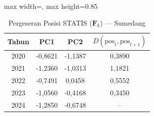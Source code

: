 \begin{table}[H]
\centering
\caption{Pergeseran Posisi STATIS ($\mathbf{F}_k$) --- Sumedang} \label{tab:app1jarak_statis_skor_sumedang}
\begin{adjustbox}{max width=\textwidth, max height=0.85\textheight}
\begin{tabular}{|c|c|c|c|}
\hline
\textbf{Tahun} & \textbf{PC1} & \textbf{PC2} & \textbf{$D(\text{pos}_t, \text{pos}_{t+1})$} \\
\hline
2020 & -0,8621 & -1,1387 & 0,3890 \\
2021 & -1,2360 & -1,0313 & 1,1821 \\
2022 & -0,7491 & 0,0458 & 0,5552 \\
2023 & -1,0560 & -0,4168 & 0,3450 \\
2024 & -1,2850 & -0,6748 & -- \\
\hline
\end{tabular}
\end{adjustbox}
\end{table}